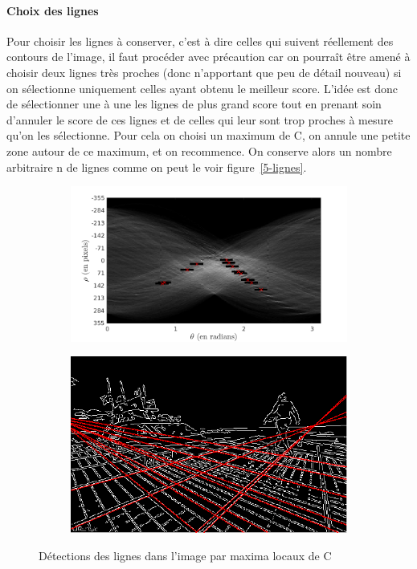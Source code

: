 \documentclass{article}
\begin{document}
\paragraph{Choix des lignes}
Pour choisir les lignes à conserver, c'est à dire celles qui suivent réellement des contours de l'image, il faut procéder avec précaution car on pourraît être amené à choisir deux lignes très proches (donc n'apportant que peu de détail nouveau) si on sélectionne uniquement celles ayant obtenu le meilleur score. L'idée est donc de sélectionner une à une les lignes de plus grand score tout en prenant soin d'annuler le score de ces lignes et de celles qui leur sont trop proches à mesure qu'on les sélectionne. Pour cela on choisi un maximum de C, on annule une petite zone autour de ce maximum, et on recommence. On conserve alors un nombre arbitraire n de lignes comme on peut le voir figure~\ref{5-lignes}.
\begin{figure}[!ht]
    \centering
    \begin{subfigure}[c]{0.49\linewidth}
        \centering
        \includegraphics[width=\linewidth]{images/5-C_lines.png}
    \end{subfigure}
    \hfill
    \begin{subfigure}[c]{0.49\linewidth}
        \centering
        \includegraphics[width=\linewidth]{images/5-lines.png}
    \end{subfigure}
    \caption{Détections des lignes dans l'image par maxima locaux de C}
    \label{5-contours}
\end{figure}
\end{document}
